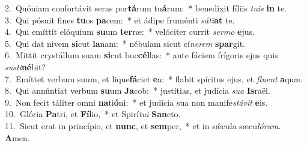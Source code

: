 {2.~}Quóniam confortávit seras por\textbf{tá}rum tu\textbf{á}rum:~* benedíxit fíliis \textit{tu}\textit{is} \textbf{in} te.\\
{3.~}Qui pósuit fines \textbf{tu}os \textbf{pa}cem:~* et ádipe fruménti \textit{sá}\textit{ti}\textbf{at} te.\\
{4.~}Qui emíttit elóquium \textbf{su}um \textbf{ter}ræ:~* velóciter currit \textit{ser}\textit{mo} \textbf{e}jus.\\
{5.~}Qui dat nivem \textbf{si}cut \textbf{la}nam:~* nébulam sicut cí\textit{ne}\textit{rem} \textbf{spar}git.\\
{6.~}Mittit crystállum suam \textbf{si}cut buc\textbf{cél}las:~* ante fáciem frígoris ejus quis \textit{su}\textit{sti}\textbf{né}bit?\\
{7.~}Emíttet verbum suum, et lique\textbf{fá}ciet \textbf{e}a:~* flabit spíritus ejus, et \textit{flu}\textit{ent} \textbf{a}quæ.\\
{8.~}Qui annúntiat verbum \textbf{su}um \textbf{Ja}cob:~* justítias, et judícia \textit{su}\textit{a} \textbf{Is}raël.\\
{9.~}Non fecit táliter omni \textbf{na}ti\textbf{ó}ni:~* et judícia sua non manife\textit{stá}\textit{vit} \textbf{e}is.\\
{10.~}Glória \textbf{Pa}tri, et \textbf{Fí}lio,~* et Spirí\textit{tu}\textit{i} \textbf{San}cto.\\
{11.~}Sicut erat in princípio, et \textbf{nunc}, et \textbf{sem}per,~* et in sǽcula sæcu\textit{ló}\textit{rum}. \textbf{A}men.\\
